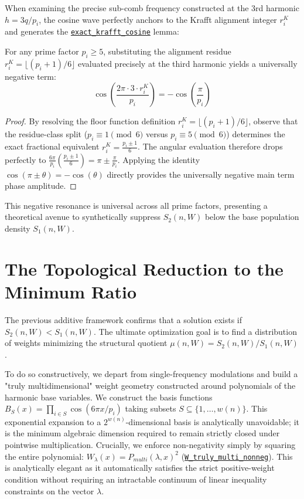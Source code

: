 \documentclass[lean]{AFM}
\renewcommand{\.}{\hskip .75pt}
\def\urlpfx{https://github.com/ElNando888/KrafftSieve/blob/v1.2}
\begin{document}
When examining the precise sub-comb frequency constructed at the 3rd harmonic $h = 3q/p_i$, the
cosine wave perfectly anchors to the Krafft alignment integer $r^K_i$ and generates the
\href{\urlpfx/KrafftSieve/ThirdHarmonic.lean#L716}{\texttt{exact\_krafft\_cosine}} lemma:

\begin{lemma}
For any prime factor $p_i \ge 5$, substituting the alignment residue
$r_i^K = \lfloor(p_i+1)/6\rfloor$ evaluated precisely at the third harmonic yields a
universally negative term:
$$ \cos\left( \frac{2\pi \cdot 3 \cdot r^K_i}{p_i} \right) = -\cos\left( \frac{\pi}{p_i} \right) $$
\end{lemma}
\begin{proof}
By resolving the floor function definition $r_i^K = \lfloor(p_i+1)/6\rfloor$, observe that the
residue-class split ($p_i \equiv 1 \pmod{6}$ versus $p_i \equiv 5 \pmod{6}$) determines the
exact fractional equivalent $r_i^K = \frac{p_i \pm 1}{6}$. The angular evaluation therefore drops
perfectly to $\frac{6\pi}{p_i} \left(\frac{p_i \pm 1}{6}\right) = \pi \pm \frac{\pi}{p_i}$.
Applying the identity $\cos(\pi \pm \theta) = -\cos(\theta)$ directly provides the universally
negative main term phase amplitude.
\end{proof}

This negative resonance is universal across all prime factors, presenting a theoretical avenue
to synthetically suppress $S_2(n, W)$ below the base population density $S_1(n, W)$.

\section{The Topological Reduction to the Minimum Ratio} \label{minimum}

The previous additive framework confirms that a solution exists if $S_2(n, W) < S_1(n, W)$. The
ultimate optimization goal is to find a distribution of weights minimizing the structural quotient
$\mu(n, W) = S_2(n, W) / S_1(n, W)$. 

To do so constructively, we depart from single-frequency modulations and build a "truly
multidimensional" weight geometry constructed around polynomials of the harmonic base variables.
We construct the basis functions $B_S(x) = \prod_{i \in S} \cos(6\pi x/p_i)$ taking subsets
$S \subseteq \{1, \dots, w(n)\}$. This exponential expansion to a $2^{w(n)}$-dimensional basis is
analytically unavoidable; it is the minimum algebraic dimension required to remain strictly closed
under pointwise multiplication. Crucially, we enforce non-negativity simply by squaring the entire
polynomial: $W_{\lambda}(x) = P_{multi}(\lambda, x)^2$
(\href{\urlpfx/KrafftSieve/OptimalWeights.lean#L114}{\texttt{W\_truly\_multi\_nonneg}}). This is
analytically elegant as it automatically satisfies the strict positive-weight condition without
requiring an intractable continuum of linear inequality constraints on the vector $\lambda$.
\end{document}
